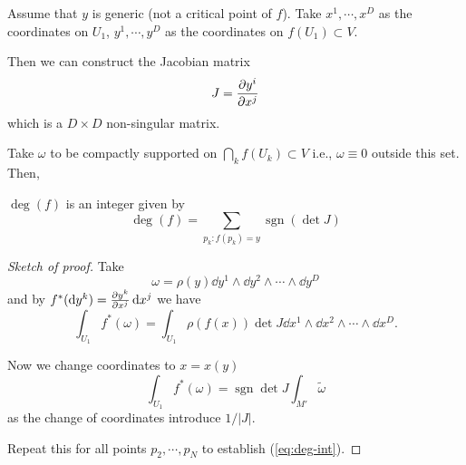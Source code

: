 \documentclass[a4paper,11pt]{article}
\DeclareMathOperator{\sgn}{sgn}
\begin{document}
    Assume that $y$ is generic (not a critical point of $f$). Take $x^1, \cdots, x^D$ as the coordinates on $U_1$, $y^1, \cdots, y^D$ as the coordinates on $f(U_1) \subset V$. 

    Then we can construct the Jacobian matrix
    \begin{equation}
        J = \pdv{y^i}{x^j}
    \end{equation}
    which is a $D\times D$ non-singular matrix.

    Take $\omega$ to be compactly supported on $\bigcap_k f(U_k) \subset V$ i.e., $\omega \equiv 0$ outside this set. Then, 
    \begin{thm}
        $\deg(f)$ is an integer given by 
        \begin{equation}
            \deg(f) = \sum_{p_k: f(p_k) = y} \sgn\left( \det J \right)\label{eq:deg-int}
        \end{equation}
    \end{thm}
    \begin{proof}[Sketch of proof]
        Take 
        \begin{equation}
            \omega = \rho(y) \dd{y^1} \wedge \dd{y^2} \wedge \cdots \wedge \dd{y^D}
        \end{equation}
        and by $f^*(\dd{y^k}) = \pdv{y^k}{x^j} \dd{x^j}$ we have 
        \begin{equation}
            \int_{U_1} f^*(\omega) = \int_{U_1} \rho(f(x)) \det J \dd{x^1} \wedge \dd{x^2} \wedge \cdots \wedge \dd{x^D}.
        \end{equation} 

        Now we change coordinates to $x=x(y)$ 
        \begin{equation}
            \int_{U_1} f^*(\omega) = \sgn{\det J} \int_{M'} \tilde \omega
        \end{equation}
        as the change of coordinates introduce $1/|J|$. 
        
        Repeat this for all points $p_2, \cdots, p_N$ to establish (\ref{eq:deg-int}).
    \end{proof}
\end{document}
